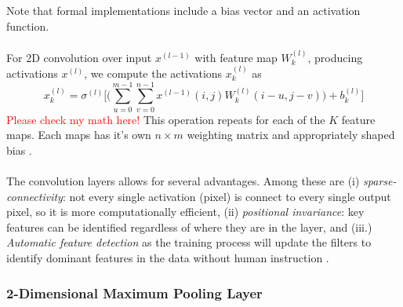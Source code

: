 \documentclass[12pt,letterpaper]{article}
\begin{document}
Note that formal implementations include a bias vector and an activation function.

\paragraph*{}For 2D convolution over input $x^{(l-1)}$ with feature map $W^{(l)}_k$, producing activations $x^{(l)}$, we compute the activations $x^{(l)}_{k}$ as \cite{Goodfellow}
\begin{equation}
\label{eqn-ConvFeedForward}
x^{(l)}_k = \sigma^{(l)}\bigg[ \Big( \sum_{u=0}^{m-1} \sum_{v=0}^{n-1} x^{(l-1)}(i,j) W^{(l)}_k(i - u,j - v) \Big) + b^{(l)}_k \bigg]
\end{equation}
\textcolor{red}{Please check my math here!}
This operation repeats for each of the $K$ feature maps. Each maps has it's own $n \times m$ weighting matrix and appropriately shaped bias .

\paragraph*{}The convolution layers allows for several advantages. Among these are (i) \textit{sparse-connectivity}: not every single activation (pixel) is connect to every single output pixel, so it is more computationally efficient, (ii) \textit{positional invariance}: key features can be identified regardless of where they are in the layer, and (iii.) \textit{Automatic feature detection} as the training process will update the filters to identify dominant features in the data without human instruction \cite{Geron,Goodfellow,Loy}.


\subsubsection{2-Dimensional Maximum Pooling Layer}
\label{subsubsec-2DPool}
\end{document}
